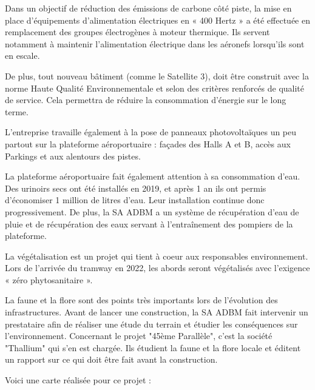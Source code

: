 Dans un objectif de réduction des émissions de carbone côté piste, la mise en place d’équipements d’alimentation électriques en « 400 Hertz » a été effectuée en remplacement des groupes électrogènes à moteur thermique. Ils servent notamment à maintenir l'alimentation électrique dans les aéronefs lorsqu'ils sont en escale.


De plus, tout nouveau bâtiment (comme le Satellite 3), doit être construit avec la norme Haute Qualité Environnementale et selon des critères renforcés de qualité de service. Cela permettra de réduire la consommation d'énergie sur le long terme.\newline


L'entreprise travaille également à la pose de panneaux photovoltaïques un peu partout sur la plateforme aéroportuaire : façades des Halls A et B, accès aux Parkings et aux alentours des pistes.


La plateforme aéroportuaire fait également attention à sa consommation d'eau. Des urinoirs secs ont été installés en 2019, et après 1 an ils ont permis d'économiser 1 million de litres d'eau. Leur installation continue donc progressivement.
De plus, la SA ADBM a un système de récupération d'eau de pluie et de récupération des eaux servant à l'entraînement des pompiers de la plateforme.\newline


La végétalisation est un projet qui tient à coeur aux responsables environnement. Lors de l'arrivée du tramway en 2022, les abords seront végétalisés avec l'exigence « zéro phytosanitaire ».\newline


La faune et la flore sont des points très importants lors de l'évolution des infrastructures. Avant de lancer une construction, la SA ADBM fait intervenir un prestataire afin de réaliser une étude du terrain et étudier les conséquences sur l'environnement.
Concernant le projet "45ème Parallèle", c'est la société "Thallium" qui s'en est chargée. Ils étudient la faune et la flore locale et éditent un rapport sur ce qui doit être fait avant la construction.

Voici une carte réalisée pour ce projet :

